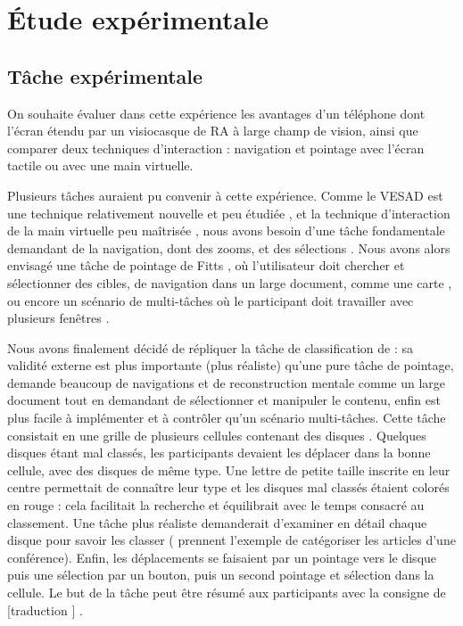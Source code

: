 \chapter{Étude expérimentale}
\label{ch:experiment}

\section{Tâche expérimentale}
\label{sec:experiment_task}

On souhaite évaluer dans cette expérience les avantages d'un téléphone dont l'écran étendu par un visiocasque de RA à large champ de vision, ainsi que comparer deux techniques d'interaction : navigation et pointage avec l'écran tactile ou avec une main virtuelle.

Plusieurs tâches auraient pu convenir à cette expérience. Comme le VESAD est une technique relativement nouvelle et peu étudiée \citep{Grubert2015}, et la technique d'interaction de la main virtuelle peu maîtrisée \citep{Argelaguet2013, Piumsomboon2013}, nous avons besoin d'une tâche fondamentale demandant de la navigation, dont des zooms, et des sélections \citep{Bowman2004}. Nous avons alors envisagé une tâche de pointage de Fitts \citep{Soukoreff2004, Berge2014}, où l'utilisateur doit chercher et sélectionner des cibles, de navigation dans un large document, comme une carte \citep{Baudisch2002, Raedle2014}, ou encore un scénario de multi-tâches où le participant doit travailler avec plusieurs fenêtres \citep{Czerwinski2003, Ens2014}.

Nous avons finalement décidé de répliquer la tâche de classification de \cite{Liu2014} : sa validité externe est plus importante (plus réaliste) qu'une pure tâche de pointage, demande beaucoup de navigations et de reconstruction mentale comme un large document tout en demandant de sélectionner et manipuler le contenu, enfin est plus facile à implémenter et à contrôler qu'un scénario multi-tâches. Cette tâche consistait en une grille de plusieurs cellules contenant des disques . Quelques disques étant mal classés, les participants devaient les déplacer dans la bonne cellule, avec des disques de même type. Une lettre de petite taille inscrite en leur centre permettait de connaître leur type et les disques mal classés étaient colorés en rouge : cela facilitait la recherche et équilibrait avec le temps consacré au classement. Une tâche plus réaliste demanderait d'examiner en détail chaque disque pour savoir les classer (\citeauthor{Liu2014} prennent l'exemple de catégoriser les articles d'une conférence). Enfin, les déplacements se faisaient par un pointage vers le disque puis une sélection par un bouton, puis un second pointage et sélection dans la cellule. Le but de la tâche peut être résumé aux participants avec la consigne de [traduction ] \citep{Liu2014}.

